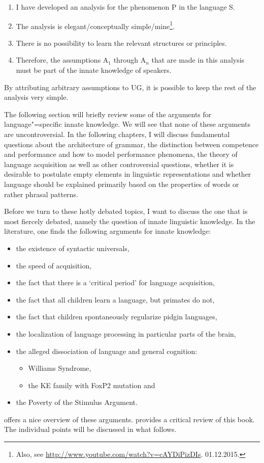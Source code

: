 \begin{enumerate}
\item I have developed an analysis for the phenomenon P in the language S.
\item The analysis is elegant/conceptually simple/mine\footnote{
    Also, see
    \url{http://www.youtube.com/watch?v=cAYDiPizDIs}. 01.12.2015.\nocite{Zappa86a}
}.
\item There is no possibility to learn the relevant structures or principles.
\item Therefore, the assumptions A$_1$ through A$_n$ that are made in this analysis must be part of the innate knowledge
of speakers.
\end{enumerate}
By attributing arbitrary assumptions to UG, it is possible to keep the rest of the analysis very
simple.

The following section will briefly review some of the arguments for language"=specific innate knowledge.
We will see that none of these arguments are uncontroversial. In the following chapters, I will discuss fundamental
questions about the architecture of grammar, the distinction between competence and performance and how to model
performance phenomena, the theory of language acquisition as well as other controversial questions, \eg 
whether it is desirable to postulate empty elements in linguistic representations and whether language should
be explained primarily based on the properties of words or rather phrasal patterns.

Before we turn to these hotly debated topics, I want to discuss the one that is most fiercely
debated, namely the question of innate linguistic knowledge. In the literature, one finds the
following arguments for innate knowledge:

\begin{itemize}
\item the existence of syntactic universals,
\item the speed of acquisition,
\item the fact that there is a `critical period' for language acquisition,
\item the fact that all children learn a language, but primates do not,
\item the fact that children spontaneously regularize pidgin languages, 
\item the localization of language processing in particular parts of the brain,
\item the alleged dissociation of language and general cognition:
\begin{itemize}
\item Williams Syndrome,
\item the KE family with FoxP2 mutation and
\end{itemize}
\item the Poverty of the Stimulus Argument.
\end{itemize}
\citet{Pinker94a} offers a nice overview of these arguments. \citet{Tomasello95a} provides a critical review of this book. The individual points will be discussed in what follows.

